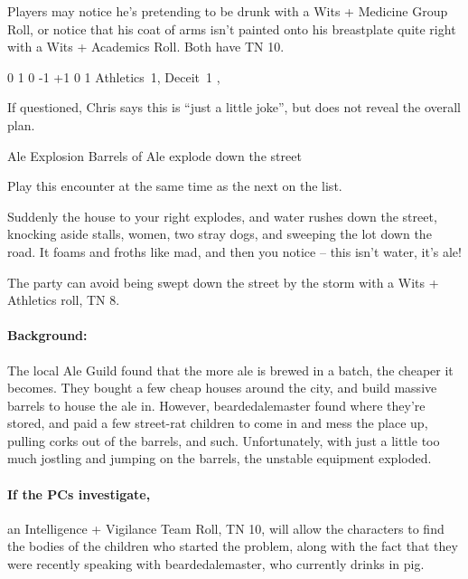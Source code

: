 \begin{multicols}{2}
Players may notice he's pretending to be drunk with a Wits + Medicine Group Roll, or notice that his coat of arms isn't painted onto his breastplate quite right with a Wits + Academics Roll.
Both have TN 10.


  {0}%
  {1}%
  {{0}%
  {-1}%
  {+1}}%
  {0}%
  {1}%
  {Athletics~1, Deceit~1}%
  {\longsword, \completeplate}%
  {\addtocounter{xpbonus}{-3}}

If questioned, Chris says this is ``just a little joke'', but does not reveal the overall plan.

{Ale Explosion}%
{Barrels of Ale explode down the street}%

Play this encounter at the same time as the next on the list.

\begin{boxtext}

  Suddenly the house to your right explodes, and water rushes down the street, knocking aside stalls, women, two stray dogs, and sweeping the lot down the road.  It foams and froths like mad, and then you notice -- this isn't water, it's ale!

\end{boxtext}

The party can avoid being swept down the street by the storm with a Wits + Athletics roll, TN 8.

\paragraph{Background:} The local Ale Guild found that the more ale is brewed in a batch, the cheaper it becomes.
They bought a few cheap houses around the city, and build massive barrels to house the ale in.
However, \gls{beardedalemaster} found where they're stored, and paid a few street-rat children to come in and mess the place up, pulling corks out of the barrels, and such.
Unfortunately, with just a little too much jostling and jumping on the barrels, the unstable equipment exploded.

\paragraph{If the PCs investigate,}
an Intelligence + Vigilance Team Roll, TN 10, will allow the characters to find the bodies of the children who started the problem, along with the fact that they were recently speaking with \gls{beardedalemaster}, who currently drinks in \gls{pig}.%
\iftoggle{core}%
{\footnote{See the core rules, page \pageref{teamwork}, for Team Rolls.}}%
{}%


\end{multicols}
